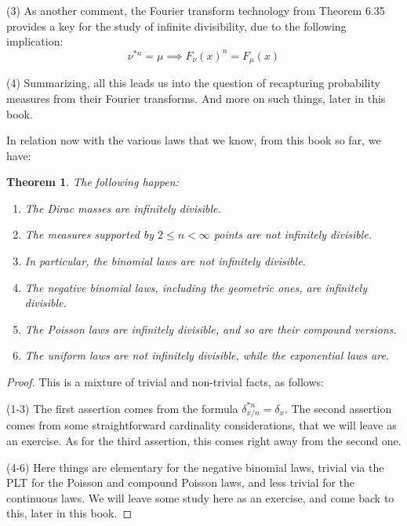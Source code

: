 \documentclass[12pt]{amsbook}
\newtheorem{theorem}{Theorem}[chapter]
\begin{document}
\bigskip

(3) As another comment, the Fourier transform technology from Theorem 6.35 provides a key for the study of infinite divisibility, due to the following implication:
$$\nu^{*n}=\mu\implies F_\nu(x)^n=F_\mu(x)$$

(4) Summarizing, all this leads us into the question of recapturing probability measures from their Fourier transforms. And more on such things, later in this book. 

\bigskip

In relation now with the various laws that we know, from this book so far, we have:

\begin{theorem}
The following happen:
\begin{enumerate}
\item The Dirac masses are infinitely divisible.

\item The measures supported by $2\leq n<\infty$ points are not infinitely divisible.

\item In particular, the binomial laws are not infinitely divisible.

\item The negative binomial laws, including the geometric ones, are infinitely divisible.

\item The Poisson laws are infinitely divisible, and so are their compound versions.

\item The uniform laws are not infinitely divisible, while the exponential laws are.
\end{enumerate}
\end{theorem}

\begin{proof}
This is a mixture of trivial and non-trivial facts, as follows:

\medskip

(1-3) The first assertion comes from the formula $\delta_{x/n}^{*n}=\delta_x$. The second assertion comes from some straightforward cardinality considerations, that we will leave as an exercise. As for the third assertion, this comes right away from the second one.

\medskip

(4-6) Here things are elementary for the negative binomial laws, trivial via the PLT for the Poisson and compound Poisson laws, and less trivial for the continuous laws. We will leave some study here as an exercise, and come back to this, later in this book.
\end{proof}
\end{document}
